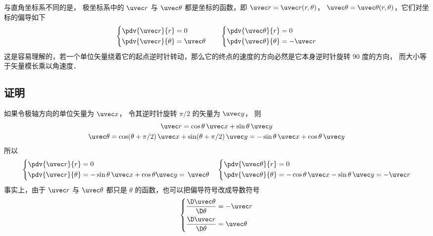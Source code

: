

与直角坐标系不同的是， 极坐标系中的 $\uvec r$ 与 $\uvec \theta $ 都是坐标的函数，即 $\uvec r = \uvec r (r,\theta)$， $\uvec \theta  = \uvec \theta (r,\theta)$，它们对坐标的偏导如下
\begin{equation}\label{Dpol1_eq1}
\left\{ \begin{aligned}
\pdv{\uvec r}{r} &= 0\\
\pdv{\uvec r}{\theta} &= \uvec \theta 
\end{aligned} \right.
\qquad
\left\{ \begin{aligned}
\pdv{\uvec \theta}{r} &= 0\\
\pdv{\uvec \theta}{\theta} &=  - \uvec r
\end{aligned} \right.
\end{equation}
这是容易理解的，若一个单位矢量绕着它的起点逆时针转动，那么它的终点的速度的方向必然是它本身逆时针旋转 90 度的方向， 而大小等于矢量模长乘以角速度．
\subsection{证明}
如果令极轴方向的单位矢量为 $\uvec x$， 令其逆时针旋转 $\pi/2$ 的矢量为 $\uvec y$， 则
\begin{gather}
\uvec r = \cos \theta \,\uvec x + \sin \theta \,\uvec y\\
\uvec \theta  = \cos (\theta +\pi/2)\,\uvec x + \sin (\theta +\pi/2)\,\uvec y
=  - \sin \theta \,\uvec x + \cos \theta \,\uvec y
\end{gather} 
所以
\begin{equation}
\left\{ \begin{aligned}
\pdv{\uvec r}{r} &= 0\\
\pdv{\uvec r}{\theta} &=  - \sin \theta \,\uvec x + \cos \theta \uvec y = \,\uvec \theta 
\end{aligned} \right.
\quad
\left\{ \begin{aligned}
\pdv{\uvec \theta}{r} &= 0\\
\pdv{\uvec \theta}{\theta} &=  - \cos \theta \,\uvec x - \sin \theta \,\uvec y =  - \uvec r
\end{aligned} \right.
\end{equation}  
事实上，由于 $\uvec r$ 与 $\uvec \theta $ 都只是 $\theta$ 的函数，也可以把偏导符号改成导数符号
 \begin{equation}
\left\{ \begin{aligned}
\frac{{\D \uvec \theta }}{{\D \theta }} &=  - \uvec r\\
\frac{{\D \uvec r}}{{\D \theta }} &= \uvec \theta 
\end{aligned} \right.
\end{equation}
 
 
 
 
 
 
 
 
 
 
 
 
 
 
 
 
 
 
 
 
 
 
 
 
 
 